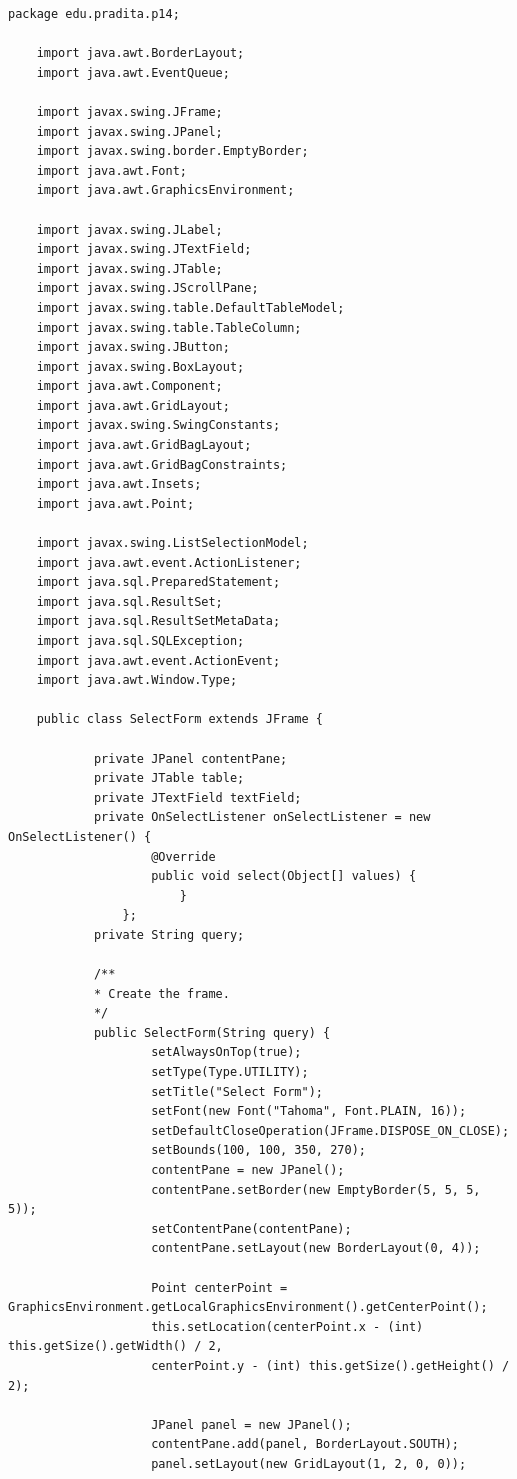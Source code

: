 \begin{lstlisting}[style=JavaStyle]
	package edu.pradita.p14;
	
	import java.awt.BorderLayout;
	import java.awt.EventQueue;
	
	import javax.swing.JFrame;
	import javax.swing.JPanel;
	import javax.swing.border.EmptyBorder;
	import java.awt.Font;
	import java.awt.GraphicsEnvironment;
	
	import javax.swing.JLabel;
	import javax.swing.JTextField;
	import javax.swing.JTable;
	import javax.swing.JScrollPane;
	import javax.swing.table.DefaultTableModel;
	import javax.swing.table.TableColumn;
	import javax.swing.JButton;
	import javax.swing.BoxLayout;
	import java.awt.Component;
	import java.awt.GridLayout;
	import javax.swing.SwingConstants;
	import java.awt.GridBagLayout;
	import java.awt.GridBagConstraints;
	import java.awt.Insets;
	import java.awt.Point;
	
	import javax.swing.ListSelectionModel;
	import java.awt.event.ActionListener;
	import java.sql.PreparedStatement;
	import java.sql.ResultSet;
	import java.sql.ResultSetMetaData;
	import java.sql.SQLException;
	import java.awt.event.ActionEvent;
	import java.awt.Window.Type;
	
	public class SelectForm extends JFrame {
			
			private JPanel contentPane;
			private JTable table;
			private JTextField textField;
			private OnSelectListener onSelectListener = new OnSelectListener() {
					@Override
					public void select(Object[] values) {
						}
				};
			private String query;
			
			/**
			* Create the frame.
			*/
			public SelectForm(String query) {
					setAlwaysOnTop(true);
					setType(Type.UTILITY);
					setTitle("Select Form");
					setFont(new Font("Tahoma", Font.PLAIN, 16));
					setDefaultCloseOperation(JFrame.DISPOSE_ON_CLOSE);
					setBounds(100, 100, 350, 270);
					contentPane = new JPanel();
					contentPane.setBorder(new EmptyBorder(5, 5, 5, 5));
					setContentPane(contentPane);
					contentPane.setLayout(new BorderLayout(0, 4));
					
					Point centerPoint = GraphicsEnvironment.getLocalGraphicsEnvironment().getCenterPoint();
					this.setLocation(centerPoint.x - (int) this.getSize().getWidth() / 2,
					centerPoint.y - (int) this.getSize().getHeight() / 2);
					
					JPanel panel = new JPanel();
					contentPane.add(panel, BorderLayout.SOUTH);
					panel.setLayout(new GridLayout(1, 2, 0, 0));
					

\end{lstlisting}
